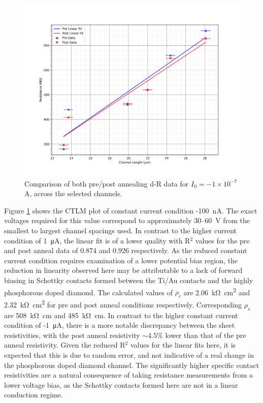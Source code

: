 \begin{refsection}
\begin{figure}[H]
    \centering
    \includegraphics[width=\textwidth]{Chapter3/Figs/Raster/Sample F 2022/Comparison/1e-07A.png}
    \caption{Comparison of both pre/post annealing d-R data for $I_{0}=-1\times10^{-7}$ \si{\ampere}, across the selected channels.}
    \label{fig:comparison-dr-1e-7}
\end{figure}

Figure \ref{fig:comparison-dr-1e-7} shows the CTLM plot of constant current condition -100~\si{\nano\ampere}. The exact voltages required for this value correspond to approximately 30--60~\si{\volt} from the smallest to largest channel spacings used. In contrast to the higher current condition of 1~\si{\micro\ampere}, the linear fit is of a lower quality with R$^{2}$ values for the pre and post anneal data of 0.874 and 0.926 respectively. As the reduced constant current condition requires examination of a lower potential bias region, the reduction in linearity observed here may be attributable to a lack of forward biasing in Schottky contacts formed between the Ti/Au contacts and the highly phosphorous doped diamond. The calculated values of $\rho_{c}$ are 2.06~\si{\kilo\ohm\centi\metre\squared} and 2.32~\si{\kilo\ohm\centi\metre\squared} for pre and post anneal conditions respectively. Corresponding $\rho_{s}$ are 508~\si{\kilo\ohm\centi\metre} and 485~\si{\kilo\ohm\centi\metre}. In contrast to the higher constant current condition of -1~\si{\micro\ampere}, there is a more notable discrepancy between the sheet resistivities, with the post anneal resistivity $\sim4.5$\% lower than that of the pre anneal resistivity. Given the reduced R$^{2}$ values for the linear fits here, it is expected that this is due to random error, and not indicative of a real change in the phosphorous doped diamond channel. The significantly higher specific contact resistivities are a natural consequence of taking resistance measurements from a lower voltage bias, as the Schottky contacts formed here are not in a linear conduction regime.


\end{refsection}
